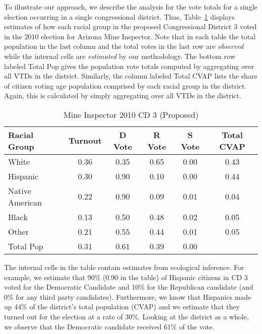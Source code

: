 \documentclass[12pt,draft]{scrartcl}
\begin{document}
To illustrate our approach, we describe the analysis for the vote
totals for a single election occurring in a single congressional
district.  Thus, Table~\ref{smine_cvap_cd_3_ex} displays estimates of
how each racial group in the proposed Congressional District 3 voted
in the 2010 election for Arizona Mine Inspector. Note that in each
table the total population in the last column and the total votes in
the last row are {\it observed} while the internal cells are {\it estimated} 
by our methodology. The bottom row labeled Total Pop
gives the population vote totals computed by aggregating over all VTDs
in the district.  Similarly, the column labeled Total CVAP lists the
share of citizen voting age population comprised by each racial group
in the district.  Again, this is calculated by simply aggregating over
all VTDs in the district.

\begin{table}[ht]
\begin{center}
\caption{Mine Inspector 2010 CD 3 (Proposed)}
\label{smine_cvap_cd_3_ex}
\begin{tabular}{lccccc}
  \hline
Racial Group & Turnout & D Vote & R Vote & S Vote & Total CVAP\\ 
  \hline
White & 0.36 & 0.35 & 0.65 & 0.00 & 0.43 \\ 
  Hispanic & 0.30 & 0.90 & 0.10 & 0.00 & 0.44 \\ 
  Native American & 0.22 & 0.90 & 0.09 & 0.01 & 0.04 \\ 
  Black & 0.13 & 0.50 & 0.48 & 0.02 & 0.05 \\ 
  Other & 0.21 & 0.55 & 0.44 & 0.01 & 0.05 \\ 
  Total Pop & 0.31 & 0.61 & 0.39 & 0.00 &  \\ 
   \hline
\end{tabular}
\end{center}
\end{table}

The internal cells in the table contain estimates from ecological
inference. For example, we estimate that 90\% (0.90 in the table) of
Hispanic citizens in CD 3 voted for the Democratic Candidate and 10\%
for the Republican candidate (and 0\% for any third party candidates).
Furthermore, we know that Hispanics made up 44\% of the district's
total population (CVAP) and we estimate that they turned out for the
election at a rate of 30\%.  Looking at the district as a whole, we
observe that the Democratic candidate received 61\% of the vote. 

\end{document}
